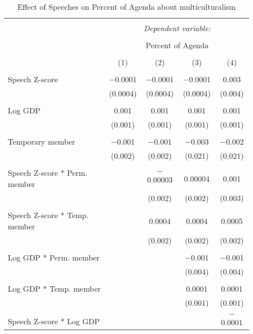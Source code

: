 
\begin{table}[!htbp] \centering 
  \caption{Effect of Speeches on Percent of Agenda about multiculturalism} 
  \label{} 
\begin{tabular}{@{\extracolsep{5pt}}lcccc} 
\\[-1.8ex]\hline 
\hline \\[-1.8ex] 
 & \multicolumn{4}{c}{\textit{Dependent variable:}} \\ 
\cline{2-5} 
\\[-1.8ex] & \multicolumn{4}{c}{Percent of Agenda} \\ 
\\[-1.8ex] & (1) & (2) & (3) & (4)\\ 
\hline \\[-1.8ex] 
 Speech Z-score & $-$0.0001 & $-$0.0001 & $-$0.0001 & 0.003 \\ 
  & (0.0004) & (0.0004) & (0.0004) & (0.004) \\ 
  & & & & \\ 
 Log GDP & 0.001 & 0.001 & 0.001 & 0.001 \\ 
  & (0.001) & (0.001) & (0.001) & (0.001) \\ 
  & & & & \\ 
 Temporary member & $-$0.001 & $-$0.001 & $-$0.003 & $-$0.002 \\ 
  & (0.002) & (0.002) & (0.021) & (0.021) \\ 
  & & & & \\ 
 Speech Z-score * Perm. member &  & $-$0.00003 & 0.00004 & 0.001 \\ 
  &  & (0.002) & (0.002) & (0.003) \\ 
  & & & & \\ 
 Speech Z-score * Temp. member &  & 0.0004 & 0.0004 & 0.0005 \\ 
  &  & (0.002) & (0.002) & (0.002) \\ 
  & & & & \\ 
 Log GDP * Perm. member &  &  & $-$0.001 & $-$0.001 \\ 
  &  &  & (0.004) & (0.004) \\ 
  & & & & \\ 
 Log GDP * Temp. member &  &  & 0.0001 & 0.0001 \\ 
  &  &  & (0.001) & (0.001) \\ 
  & & & & \\ 
 Speech Z-score * Log GDP &  &  &  & $-$0.0001 \\ 

\end{tabular}
\end{table}

